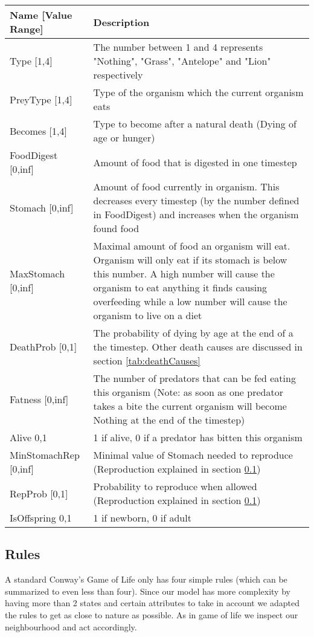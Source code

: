 \documentclass[11pt]{article}
\begin{document}
\begin{table}[htbp]
\begin{tabular}{l|p{11cm}}\label{tab:Properties}
Name [Value Range]& Description\\
\hline 
\hline 
Type [1,4]& The number between 1 and 4 represents "Nothing", "Grass", "Antelope" and "Lion" respectively  \\ 
\hline 
PreyType [1,4] & Type of the organism which the current organism eats \\ 
\hline 
Becomes [1,4]& Type to become after a natural death (Dying of age or hunger) \\ 
\hline 
FoodDigest [0,inf]& Amount of food that is digested in one timestep\\ 
\hline 
Stomach [0,inf]& Amount of food currently in organism. This decreases every timestep (by the number defined in FoodDigest) and increases when the organism found food\\ 
\hline 
MaxStomach [0,inf]& Maximal amount of food an organism will eat. Organism will only eat if its stomach is below this number. A high number will cause the organism to eat anything it finds causing overfeeding while a low number will cause the organism to live on a diet \\ 
\hline 
DeathProb [0,1]& The probability of dying by age at the end of a the timestep. Other death causes are discussed in section \ref{tab:deathCauses} \\ 
\hline 
Fatness [0,inf]& The number of predators that can be fed eating this organism (Note: as soon as one predator takes a bite the current organism will become Nothing at the end of the timestep)\\ 
\hline 
Alive {0,1}& 1 if alive, 0 if a predator has bitten this organism\\
\hline 
MinStomachRep [0,inf]& Minimal value of Stomach needed to reproduce (Reproduction explained in section \ref{tab:reproduction}) \\
\hline 
RepProb [0,1]& Probability to reproduce when allowed (Reproduction explained in section \ref{tab:reproduction})\\
\hline 
IsOffspring {0,1}& 1 if newborn, 0 if adult\\
\end{tabular}
\end{table}

\subsection{Rules}
\label{tab:reproduction}
A standard Conway's Game of Life only has four simple rules (which can be summarized to even less than four). Since our model has more complexity by having more than 2 states and certain attributes to take in account we adapted the rules to get as close to nature as possible. As in game of life we inspect our neighbourhood and act accordingly. 
\end{document}
